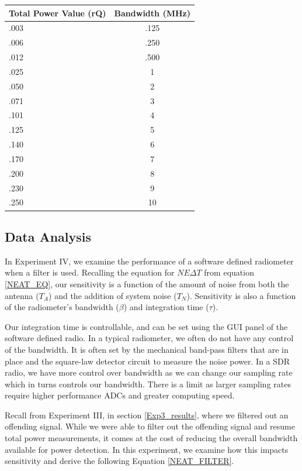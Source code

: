 {\begin{table}[h!tb] \centering
{}
\label{exp4_datapoints}
\begin{tabular}{lc} \hline
\textbf{Total Power Value (rQ)} & \textbf{Bandwidth (MHz)} \\ \hline
.003 & .125 \\
.006 & .250 \\
.012 & .500 \\
.025 & 1 \\
.050 & 2 \\
.071 & 3 \\
.101 & 4 \\
.125 & 5 \\
.140 & 6 \\
.170 & 7 \\
.200 & 8 \\
.230 & 9 \\
.250 & 10 \\ \hline
\end{tabular}
\end{table}

\subsection{Data Analysis}

In Experiment IV, we examine the performance of a software defined radiometer when a filter is used.  Recalling the equation for $NE\Delta T$ from equation \ref{NEAT_EQ}, our sensitivity is a function of the amount of noise from both the antenna ($T_{A}$) and the addition of system noise ($T_{N}$).  Sensitivity is also a function of the radiometer's bandwidth ($\beta$) and integration time ($\tau$).

Our integration time is controllable, and can be set using the GUI panel of the software defined radio.  In a typical radiometer, we often do not have any control of the bandwidth.  It is often set by the mechanical band-pass filters that are in place and the square-law detector circuit to measure the noise power.  In a SDR radio, we have more control over bandwidth as we can change our sampling rate which in turns controls our bandwidth.  There is a limit as larger sampling rates require higher performance ADCs and greater computing speed.

Recall from Experiment III, in section \ref{Exp3_results}, where we filtered out an offending signal.  While we were able to filter out the offending signal and resume total power measurements, it comes at the cost of reducing the overall bandwidth available for power detection.  In this experiment, we examine how this impacts sensitivity and derive the following Equation \ref{NEAT_FILTER}.

}
